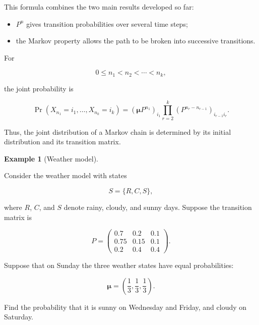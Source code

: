 \documentclass[
  letterpaper,
  DIV=11,
  numbers=noendperiod]{scrartcl}
\providecommand{\tightlist}{%
  \setlength{\itemsep}{0pt}\setlength{\parskip}{0pt}}
\theoremstyle{definition}
\newtheorem{example}{Example}[section]
\theoremstyle{remark}
\begin{document}
This formula combines the two main results developed so far:

\begin{itemize}
\tightlist
\item
  \(P^n\) gives transition probabilities over several time steps;
\item
  the Markov property allows the path to be broken into successive
  transitions.
\end{itemize}

\begin{tcolorbox}[enhanced jigsaw, arc=.35mm, bottomrule=.15mm, bottomtitle=1mm, breakable, colback=white, colbacktitle=quarto-callout-note-color!10!white, colframe=quarto-callout-note-color-frame, coltitle=black, left=2mm, leftrule=.75mm, opacityback=0, opacitybacktitle=0.6, rightrule=.15mm, title=\textcolor{quarto-callout-note-color}{\faInfo}\hspace{0.5em}{Joint probabilities at selected times}, titlerule=0mm, toprule=.15mm, toptitle=1mm]

For

\[
0\leq n_1<n_2<\cdots<n_k,
\]

the joint probability is

\[
\boxed{
\Pr(X_{n_1}=i_1,\ldots,X_{n_k}=i_k)
=
(\boldsymbol{\mu}P^{n_1})_{i_1}
\prod_{r=2}^{k}
(P^{n_r-n_{r-1}})_{i_{r-1}i_r}.
}
\]

Thus, the joint distribution of a Markov chain is determined by its
initial distribution and its transition matrix.

\end{tcolorbox}

\begin{example}[Weather
model]\protect\hypertarget{exm-weather}{}\label{exm-weather}

Consider the weather model with states

\[
S=\{R,C,S\},
\]

where \(R\), \(C\), and \(S\) denote rainy, cloudy, and sunny days.
Suppose the transition matrix is

\[
P=
\begin{pmatrix}
0.7&0.2&0.1\\
0.75&0.15&0.1\\
0.2&0.4&0.4
\end{pmatrix}.
\]

Suppose that on Sunday the three weather states have equal
probabilities:

\[
\boldsymbol{\mu}
=
\left(\frac13,\frac13,\frac13\right).
\]

Find the probability that it is sunny on Wednesday and Friday, and
cloudy on Saturday.

\end{example}
\end{document}

